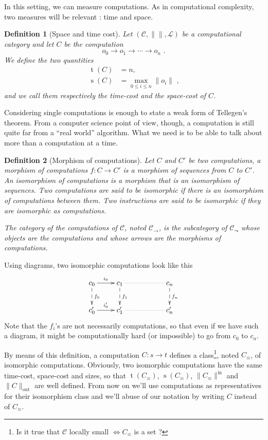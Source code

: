\documentclass{article}
\newcommand{\cat}[1]{\mathscr{#1}}
\newcommand{\C}{\cat{C}}
\renewcommand{\L}{\cat{L}}
\newcommand{\size}[1]{\lVert#1\rVert}
\newcommand{\sizein}[1]{\size{#1}^\mathrm{in}}
\newcommand{\sizeout}[1]{\size{#1}_\mathrm{out}}
\newcommand{\ra}{\rightarrow}
\DeclareMathOperator{\Time}{t}
\DeclareMathOperator{\Space}{s}
\newtheorem{definition}{Definition}
\begin{document}
  In this setting, we can measure computations. As in computational
  complexity, two measures will be relevant : time and space.

  \begin{definition}[Space and time cost]
    Let $(\C, \size{}, \L)$ be a computational category and let $C$ be
    the computation
    \[o_0 \ra o_1 \ra \cdots \ra o_n \text{ .}\]
    We define the two quantities
    \begin{align*}
      \Time(C) &= n \text{,} \\
      \Space(C) &= \max_{0\le i \le n} \size{o_i} \text{ ,}
    \end{align*}
    and we call them respectively the \emph{time-cost} and the
    \emph{space-cost} of $C$.
  \end{definition}

  Considering single computations is enough to state a weak form of
  Tellegen's theorem. From a computer science point of view, though, a
  computation is still quite far from a ``real world'' algorithm. What
  we need is to be able to talk about more than a computation at a
  time.

  \begin{definition}[Morphism of computations]
    Let $C$ and $C'$ be two computations, a \emph{morphism of
      computations} $f:C\ra C'$ is a morphism of sequences from $C$ to
    $C'$. An \emph{isomorphism of computations} is a morphism that is
    an isomorphism of sequences. Two computations are said to be
    \emph{isomorphic} if there is an isomorphism of computations
    between them. Two instructions are said to be isomorphic if they
    are isomorphic as computations.

    The category of the computations of $\C$, noted $\C_\ra$, is the
    subcategory of $\C_\leadsto$ whose objects are the computations
    and whose arrows are the morphisms of computations.
  \end{definition}

  Using diagrams, two isomorphic computations look like this
  \[\xymatrix{
    c_0 \ar[r]^{i_0} \ar@{-->}[d]^{f_0} & c_1 \ar@{-->}[d]^{f_1} \ar@{.}[rr] && c_n\ar@{-->}[d]^{f_n}\\
    c_0' \ar[r]^{i_0'} & c_1' \ar@{.}[rr] && c_n'
  }\]
  Note that the $f_i$'s are not necessarily computations, so that even
  if we have such a diagram, it might be computationally hard (or
  impossible) to go from $c_0$ to $c_n$.
  
  By means of this definition, a computation $C:s\ra t$ defines a
  class\footnote{Is it true that $\C$ locally small $\Leftrightarrow
    C_\equiv$ is a set ?}, noted $C_\equiv$, of isomorphic
  computations. Obviously, two isomorphic computations have the same
  time-cost, space-cost and sizes, so that $\Time(C_\equiv)$,
  $\Space(C_\equiv)$, $\sizein{C_\equiv}$ and $\sizeout{C}$ are well
  defined. From now on we'll use computations as representatives for
  their isomorphism class and we'll abuse of our notation by writing
  $C$ instead of $C_\equiv$.
  
\end{document}
